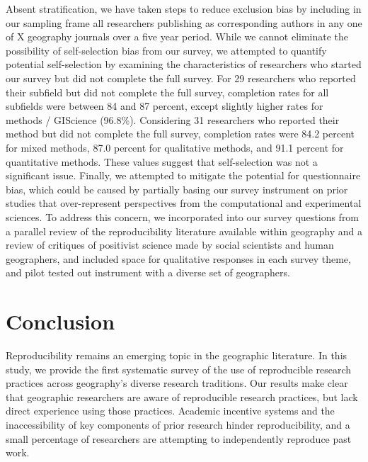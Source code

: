 \documentclass[]{interact}
\theoremstyle{plain}%
\theoremstyle{definition}
\theoremstyle{remark}
\begin{document}
Absent stratification, we have taken steps to reduce exclusion bias by including in our sampling frame all researchers publishing as corresponding authors in any one of X geography journals over a five year period.
While we cannot eliminate the possibility of self-selection bias from our survey, we attempted to quantify potential self-selection by examining the characteristics of researchers who started our survey but did not complete the full survey. 
For 29 researchers who reported their subfield but did not complete the full survey, completion rates for all subfields were between 84 and 87 percent, except slightly higher rates for methods / GIScience (96.8\%).
Considering 31 researchers who reported their method but did not complete the full survey, completion rates were 84.2 percent for mixed methods, 87.0 percent for qualitative methods, and 91.1 percent for quantitative methods. 
These values suggest that self-selection was not a significant issue.
Finally, we attempted to mitigate the potential for questionnaire bias, which could be caused by partially basing our survey instrument on prior studies that over-represent perspectives from the computational and experimental sciences.
To address this concern, we incorporated into our survey questions from a parallel review  of the reproducibility literature available within geography and a review of critiques of positivist science made by social scientists and human geographers, and included space for qualitative responses in each survey theme, and pilot tested out instrument with a diverse set of geographers.

\section*{Conclusion}
Reproducibility remains an emerging topic in the geographic literature. 
In this study, we provide the first systematic survey of the use of reproducible research practices across geography's diverse research traditions. 
Our results make clear that geographic researchers are aware of reproducible research practices, but lack direct experience using those practices.
Academic incentive systems and the inaccessibility of key components of prior research hinder reproducibility, and a small percentage of researchers are attempting to independently reproduce past work.  
\end{document}
